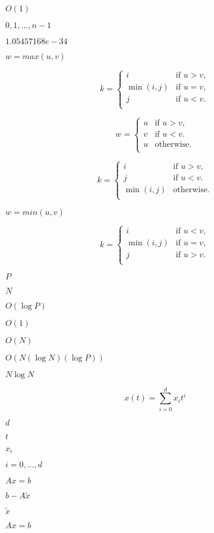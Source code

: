 \documentclass{article}
\begin{document}
$ O(1)$
\pagebreak

$0, 1, \dots, n-1$
\pagebreak

$1.05457168e-34$
\pagebreak

$w =
max(u,v)$
\pagebreak

\[
  k = \begin{cases}
    i         & \text{if $u > v$}, \\
    \min(i,j) & \text{if $u = v$}, \\
    j         & \text{if $u < v$}. \\
\end{cases}
\]
\pagebreak

\[
  w = \begin{cases}
    u     & \text{if $u > v$}, \\
    v     & \text{if $u < v$}. \\
    u     & \text{otherwise}. \\
  \end{cases}
\]
\pagebreak

\[
  k = \begin{cases}
    i         & \text{if $u > v$}, \\
    j         & \text{if $u < v$}. \\
    \min(i,j) & \text{otherwise}. \\
  \end{cases}
\]
\pagebreak

$w =
min(u,v)$
\pagebreak

\[
  k = \begin{cases}
    i         & \text{if $u < v$}, \\
    \min(i,j) & \text{if $u = v$}, \\
    j         & \text{if $u > v$}. \\
  \end{cases}
\]
\pagebreak

$P$
\pagebreak

$N$
\pagebreak

$O(\log P)$
\pagebreak

$O(1)$
\pagebreak

$O(N)$
\pagebreak

$O(N (\log N) (\log P))$
\pagebreak

$N \log N$
\pagebreak

\[
    x(t) = \sum_{i=0}^d x_i t^i
\]
\pagebreak

$d$
\pagebreak

$t$
\pagebreak

$x_i$
\pagebreak

$i=0,\dots,d$
\pagebreak

$Ax=b$
\pagebreak

$b - A \tilde{x}$
\pagebreak

$\tilde{x}$
\pagebreak

$Ax = b$
\pagebreak
\end{document}
